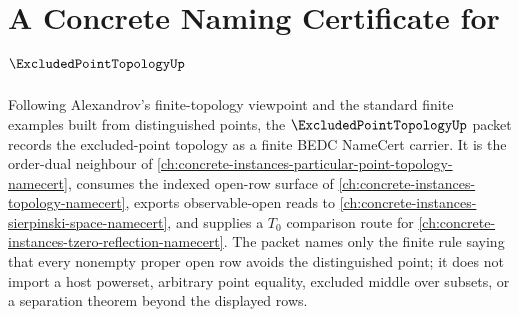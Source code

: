 \chapter{A Concrete Naming Certificate for $\ExcludedPointTopologyUp$}
\label{ch:concrete-instances-excluded-point-topology-namecert}

Following Alexandrov's finite-topology viewpoint and the standard finite examples built from distinguished points, the $\ExcludedPointTopologyUp$ packet records the excluded-point topology as a finite BEDC NameCert carrier. It is the order-dual neighbour of \autoref{ch:concrete-instances-particular-point-topology-namecert}, consumes the indexed open-row surface of \autoref{ch:concrete-instances-topology-namecert}, exports observable-open reads to \autoref{ch:concrete-instances-sierpinski-space-namecert}, and supplies a $T_0$ comparison route for \autoref{ch:concrete-instances-tzero-reflection-namecert}. The packet names only the finite rule saying that every nonempty proper open row avoids the distinguished point; it does not import a host powerset, arbitrary point equality, excluded middle over subsets, or a separation theorem beyond the displayed rows.

